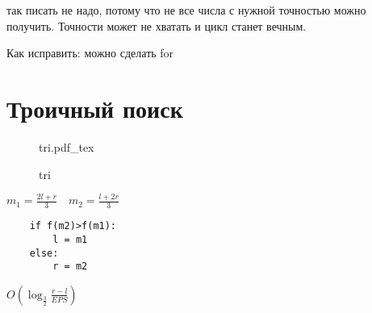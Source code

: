 \documentclass{book}
\theoremstyle{definition}
\newcommand{\incfig}[1]{%
    \def\svgwidth{\columnwidth}
    {#1.pdf_tex}
}
\begin{document}
так писать не надо, потому что не все числа с нужной точностью можно получить. Точности может не хватать и цикл станет вечным.

Как исправить: можно сделать for


\section{Троичный поиск}
\begin{figure}[ht]
    \centering
    \incfig{tri}
    \caption{tri}
    \label{fig:tri}
\end{figure}

$m_1 = \frac{2l+r}{3}\quad m_2 = \frac{l+2r}{3}$ 

\begin{verbatim}
    if f(m2)>f(m1):
        l = m1
    else:
        r = m2
\end{verbatim}

$O(\log _{\frac{3}{2}} \frac{r-l}{EPS} )$
\end{document}
